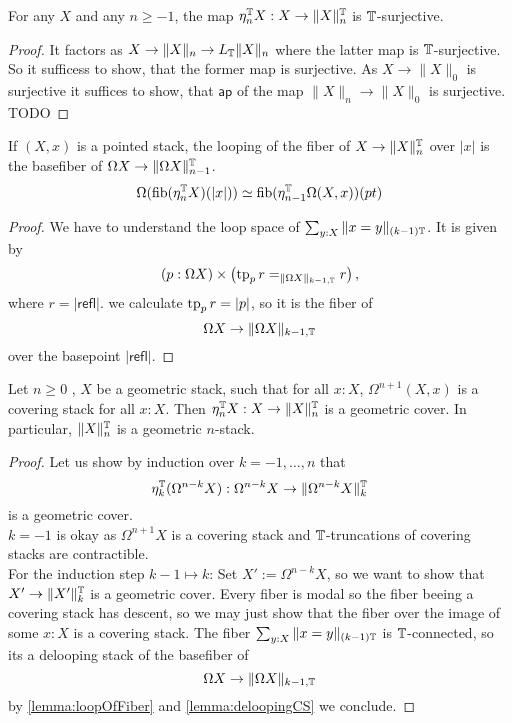 \documentclass{article}
\newcommand{\refl}{\mathsf{refl}}
\newcommand{\ap}{\mathsf{ap}}
\begin{document}
\begin{lemma}
	For any $X$ and any $n \ge -1$, the map $\eta_n^{\mathbb{T}} X : X \to \|X\|_n^{\mathbb{T}}$ is $\mathbb{T}$-surjective.
\end{lemma}
\begin{proof}
	It factors as $X \to \|X\|_n \to L_{\mathbb{T}} \|X\|_n$ where the latter map is $\mathbb{T}$-surjective. So it sufficess to show, that the former map is surjective. As $X \to \|X\|_0$ is surjective it suffices to show, that $\ap$ of the map $\|X\|_n \to \|X\|_0$ is surjective. TODO %
\end{proof}
\begin{lemma}{\label{lemma:loopOfFiber}}
	If $(X,x)$ is a pointed stack, the looping of the fiber of $X \to \|X\|_{n}^{\mathbb{T}}$ over $|x|$ is the basefiber of $\Omega X \to \|\Omega X\|_{n-1}^{\mathbb{T}}$.
	\[
	\Omega (\operatorname{fib}(\eta_n^{\mathbb{T}} X)(|x|)) \simeq \operatorname{fib} (\eta_{n-1}^{\mathbb{T}} \Omega (X,x))(pt)
	\]
\end{lemma}
\begin{proof}
	We have to understand the loop space of $\sum_{y : X} \| x = y\|_{(k-1)\mathbb{T}}$. It is given by
	\[(p : \Omega X) \times \left(\operatorname{tp}_p r =_{\|\Omega X\|_{k-1,\mathbb{T}}} r  \right),\]
	where $ r= |\refl|$.
	 we calculate $\operatorname{tp}_p r = |p|$, so it is the fiber of 
	\[
	\Omega X  \to \|\Omega X \|_{k-1, \mathbb{T}}
	\]
	over the basepoint $|\refl|$.
\end{proof}
\begin{prop}
	Let $n \ge 0$ , $X$ be a geometric stack, such that for all $x : X$, $\Omega^{n+1} (X , x)$ is a covering stack for all $x : X$. Then $\eta_n^{\mathbb{T}} X : X \to \|X\|_n^{\mathbb{T}}$ is a geometric cover. In particular, $\|X\|_n^{\mathbb{T}}$ is a geometric $n$-stack.
\end{prop}
\begin{proof}
	Let us show by induction over $k = -1,\hdots,n$ that 
	\[\eta_k^{\mathbb{T}} (\Omega^{n - k} X) : \Omega^{n - k} X \to \|\Omega^{n - k} X\|_k^{\mathbb{T}}\]
	is a geometric cover.  \\
	$k=-1$ is okay as $\Omega^{n+1} X$ is a covering stack and $\mathbb{T}$-truncations of covering stacks are contractible. \\
	For the induction step $k - 1 \mapsto k$:
	Set $X' := \Omega^{n-k} X$, so we want to show that $X' \to \|X'\|_k^{\mathbb{T}}$ is a geometric cover.
	Every fiber is modal so the fiber beeing a covering stack has descent, so we may just show that the fiber over the image of some $x : X$ is a covering stack. The fiber $\sum_{y : X} \| x = y\|_{(k-1)\mathbb{T}}$ is $\mathbb{T}$-connected, so its a delooping stack of the basefiber of 
	\[
	\Omega X  \to \|\Omega X \|_{k-1, \mathbb{T}}
	\]
	by \ref{lemma:loopOfFiber} and \ref{lemma:deloopingCS} we conclude.
\end{proof}
\end{document}
